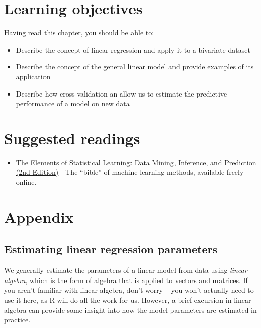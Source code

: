 \documentclass[12pt,]{book}
\providecommand{\tightlist}{%
  \setlength{\itemsep}{0pt}\setlength{\parskip}{0pt}}
\theoremstyle{definition}
\theoremstyle{definition}
\theoremstyle{definition}
\theoremstyle{remark}
\begin{document}
\hypertarget{learning-objectives-13}{%
\section{Learning objectives}\label{learning-objectives-13}}

Having read this chapter, you should be able to:

\begin{itemize}
\tightlist
\item
  Describe the concept of linear regression and apply it to a bivariate dataset
\item
  Describe the concept of the general linear model and provide examples of its application
\item
  Describe how cross-validation an allow us to estimate the predictive performance of a model on new data
\end{itemize}

\hypertarget{suggested-readings-10}{%
\section{Suggested readings}\label{suggested-readings-10}}

\begin{itemize}
\tightlist
\item
  \href{https://web.stanford.edu/~hastie/Papers/ESLII.pdf}{The Elements of Statistical Learning: Data Mining, Inference, and Prediction (2nd Edition)} - The ``bible'' of machine learning methods, available freely online.
\end{itemize}

\hypertarget{appendix-5}{%
\section{Appendix}\label{appendix-5}}

\hypertarget{estimating-linear-regression-parameters}{%
\subsection{Estimating linear regression parameters}\label{estimating-linear-regression-parameters}}

We generally estimate the parameters of a linear model from data using \emph{linear algebra}, which is the form of algebra that is applied to vectors and matrices. If you aren't familiar with linear algebra, don't worry -- you won't actually need to use it here, as R will do all the work for us. However, a brief excursion in linear algebra can provide some insight into how the model parameters are estimated in practice.
\end{document}
